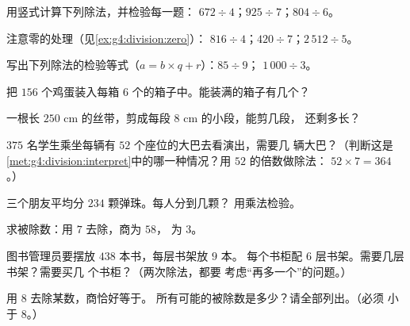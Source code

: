 \begin{exercise}[$\star$]\label{exo:g4:division:2}
用竖式计算下列除法，并检验每一题：
$672 \div 4$；\quad $925 \div 7$；\quad $804 \div 6$。
\end{exercise}

\begin{exercise}[$\star$]\label{exo:g4:division:3}
注意零的处理（见\cref{ex:g4:division:zero}）：
$816 \div 4$；\quad $420 \div 7$；\quad $2\,512 \div 5$。
\end{exercise}

\begin{exercise}[$\star$]\label{exo:g4:division:4}
写出下列除法的检验等式（$a = b \times q + r$）：$85 \div 9$；
\quad $1\,000 \div 3$。
\end{exercise}

\begin{exercise}[$\star$]\label{exo:g4:division:5}
把 $156$ 个鸡蛋装入每箱 $6$ 个的箱子中。能装满的箱子有几个？
\end{exercise}

\begin{exercise}[$\star$]\label{exo:g4:division:6}
一根长 $250$ cm 的丝带，剪成每段 $8$ cm 的小段，能剪几段，
还剩多长？
\end{exercise}

\begin{exercise}[$\star$]\label{exo:g4:division:7}
$375$ 名学生乘坐每辆有 $52$ 个座位的大巴去看演出，需要几
辆大巴？（判断这是
\cref{met:g4:division:interpret}中的哪一种情况？用 $52$ 的倍数做除法：
$52 \times 7 = 364$。）
\end{exercise}

\begin{exercise}[$\star$]\label{exo:g4:division:8}
三个朋友平均分 $234$ 颗弹珠。每人分到几颗？
用乘法检验。
\end{exercise}

\begin{exercise}[$\star$]\label{exo:g4:division:9}
求被除数：用 $7$ 去除，商为 $58$，
为 $3$。
\end{exercise}

\begin{exercise}[$\star\star$]\label{exo:g4:division:10}
图书管理员要摆放 $438$ 本书，每层书架放 $9$ 本。
每个书柜配 $6$ 层书架。需要几层书架？需要买几
个书柜？（两次除法，都要
考虑“再多一个”的问题。）
\end{exercise}

\begin{exercise}[$\star\star$]\label{exo:g4:division:11}
用 $8$ 去除某数，商恰好等于。
所有可能的被除数是多少？请全部列出。（必须
小于 $8$。）
\end{exercise}
